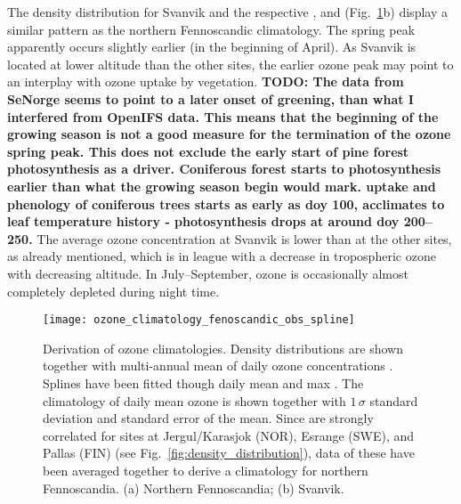 \documentclass[bg, manuscript]{copernicus}
\begin{document}
The density distribution for Svanvik and the respective , and  (Fig.~\ref{fig:ozone_climatology_fenoscandic_obs_spline}b) display a similar pattern as the northern Fennoscandic climatology. The spring peak apparently occurs slightly earlier (in the beginning of April). As Svanvik is located at lower altitude than the other sites, the earlier ozone peak may point to an interplay with ozone uptake by vegetation. {\bf TODO: The data from SeNorge seems to point to a later onset of greening, than what I interfered from OpenIFS data. This means that the beginning of the growing season is not a good measure for the termination of the ozone spring peak. This does not exclude the early start of pine forest photosynthesis as a driver. Coniferous forest starts to photosynthesis earlier than what the growing season begin would mark.  uptake and phenology of coniferous trees \citep{TB:Kolari2007} starts as early as doy 100, acclimates to leaf temperature history - photosynthesis drops at around doy 200--250.} The average ozone concentration at Svanvik is lower than at the other sites, as already mentioned, which is in league with a decrease in tropospheric ozone with decreasing altitude. In July--September, ozone is occasionally almost completely depleted during night time.

\begin{figure}[t]
  \texttt{[image: ozone\_climatology\_fenoscandic\_obs\_spline]}
  \caption{Derivation of ozone climatologies. Density distributions are shown together with multi-annual mean of daily ozone concentrations \chem{[O_3]}. Splines have been fitted though daily mean and max \chem{[O_3]}. The climatology of daily mean ozone is shown together with $1\,\sigma$ standard deviation and standard error of the mean. Since \chem{[O_3]} are strongly correlated for sites at Jergul/Karasjok (NOR), Esrange (SWE), and Pallas (FIN) (see Fig.~\ref{fig:density_distribution}), data of these have been averaged together to derive a climatology for northern Fennoscandia. (a) Northern Fennoscandia; (b) Svanvik.}
  \label{fig:ozone_climatology_fenoscandic_obs_spline}
\end{figure}
\end{document}
